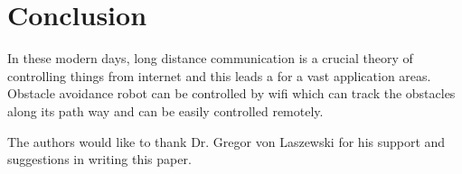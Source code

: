 \documentclass[sigconf]{acmart}
\begin{document}
\section{Conclusion}
In these modern days, long distance communication is a crucial theory of controlling things from internet and this leads a for a vast application areas. Obstacle avoidance robot can be controlled by wifi which can track the obstacles along its path way and can be easily controlled remotely.

\begin{acks}

The authors would like to thank Dr. Gregor von Laszewski for his support and suggestions in writing this paper.

\end{acks}


 
\end{document}
